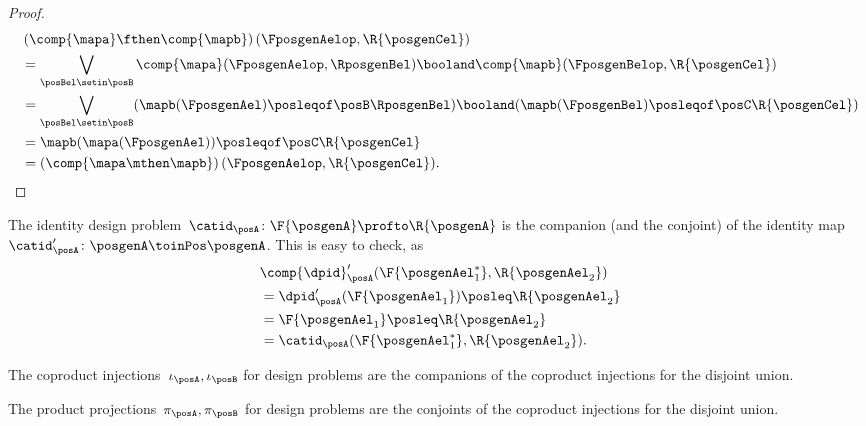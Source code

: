 \begin{proof}
    \begin{equation}
        \begin{aligned}
            ~ & \left(\comp{\mapa}\fthen \comp{\mapb}\right)(\FposgenAelop,\R{\posgenCel}) \\
              & =\bigvee_{\posBel\setin \posB} \comp{\mapa}(\FposgenAelop,\RposgenBel)\booland\comp{\mapb}(\FposgenBelop,\R{\posgenCel}) \\%
              & =\bigvee_{\posBel\setin \posB} (\mapb(\FposgenAel)\posleqof\posB \RposgenBel)\booland (\mapb(\FposgenBel)\posleqof\posC \R{\posgenCel}) \\
              & =\mapb(\mapa(\FposgenAel))\posleqof\posC \R{\posgenCel} \\
              & =\left(\comp{\mapa\mthen \mapb}\right)(\FposgenAelop,\R{\posgenCel}).
        \end{aligned}
    \end{equation}
\end{proof}

\begin{example}
    The identity design problem~$\catid_\posA\colon \F{\posgenA} \profto \R{\posgenA}$ is the companion (and the conjoint) of the identity map~$\catid_\posA'\colon \posgenA \toinPos \posgenA$.
    This is easy to check, as
    \begin{equation}
        \begin{aligned}
            ~ & \comp{\dpid}_\posA'(\F{\posgenAel_1^*},\R{\posgenAel_2}) \\
              & =\dpid_\posA'(\F{\posgenAel_1})\posleq \R{\posgenAel_2} \\
              & =\F{\posgenAel_1}\posleq \R{\posgenAel_2} \\
              & =\catid_\posA(\F{\posgenAel_1^*},\R{\posgenAel_2}).
        \end{aligned}
    \end{equation}
\end{example}

\begin{example}
    The coproduct injections~$\iota_\posA, \iota_\posB$ for design problems are the companions of the coproduct injections for the disjoint union.
\end{example}

\begin{example}
    The product projections~$\pi_\posA, \pi_\posB$ for design problems are the conjoints of the coproduct injections for the disjoint union.
\end{example}

